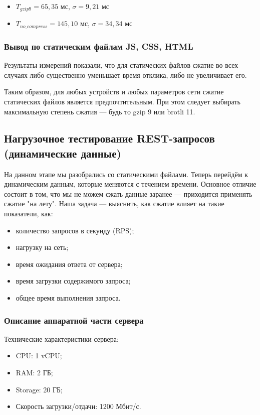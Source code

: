 \documentclass[12pt]{article}
\begin{document}
\begin{itemize}
    \item $T_{gzip9} = 65{,}35$ мс, $\sigma = 9{,}21$ мс
    \item $T_{no\_compress} = 145{,}10$ мс, $\sigma = 34{,}34$ мс
\end{itemize}

\subsubsection{Вывод по статическим файлам JS, CSS, HTML}

Результаты измерений показали, что для статических файлов сжатие во всех случаях либо существенно уменьшает время отклика, либо не увеличивает его.

Таким образом, для любых устройств и любых параметров сети сжатие статических файлов является предпочтительным. При этом следует выбирать максимальную степень сжатия — будь то gzip 9 или brotli 11.

\subsection{Нагрузочное тестирование REST-запросов (динамические данные)}

На данном этапе мы разобрались со статическими файлами. Теперь перейдём к динамическим данным, которые меняются с течением времени.
Основное отличие состоит в том, что мы не можем сжать данные заранее — приходится применять сжатие "на лету".
Наша задача — выяснить, как сжатие влияет на такие показатели, как:

\begin{itemize}
    \item количество запросов в секунду (RPS);
    \item нагрузку на сеть;
    \item время ожидания ответа от сервера;
    \item время загрузки содержимого запроса;
    \item общее время выполнения запроса.
\end{itemize}

\subsubsection{Описание аппаратной части сервера}

Технические характеристики сервера:
\begin{itemize}
    \item CPU: 1 vCPU;
    \item RAM: 2 ГБ;
    \item Storage: 20 ГБ;
    \item Скорость загрузки/отдачи: 1200 Мбит/с.
\end{itemize}
\end{document}

